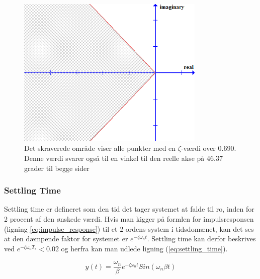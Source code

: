 \begin{figure}[ht]
	\begin{center}
		\includegraphics[width=0.8\textwidth]{Billeder/Overshoot.PNG}
	\end{center}
\caption{Det skraverede område viser alle punkter med en $\zeta$-værdi over 0.690. Denne værdi svarer også til en vinkel til den reelle akse på 46.37 grader til begge sider}
\label{fig:Overshoot}
\end{figure}

\subsubsection{Settling Time}

Settling time er defineret som den tid det tager systemet at falde til ro, inden for 2 procent af den ønskede værdi. Hvis man kigger på formlen for impulsresponsen (ligning \ref{eq:impulse_response})  til et 2-ordens-system i tidsdomænet, kan det ses at den dæmpende faktor for systemet er $e^{-\zeta\omega_{n}t}$. Settling time kan derfor beskrives ved $e^{-\zeta\omega_{n}T_{s}}<0.02$ og herfra kan man udlede ligning (\ref{eq:settling_time}).

\begin{equation}\label{eq:impulse_response}
y(t)=\frac{\omega_{n}}{\beta}e^{-\zeta\omega_{n}t}Sin(\omega_{n}\beta t)
\end{equation}

